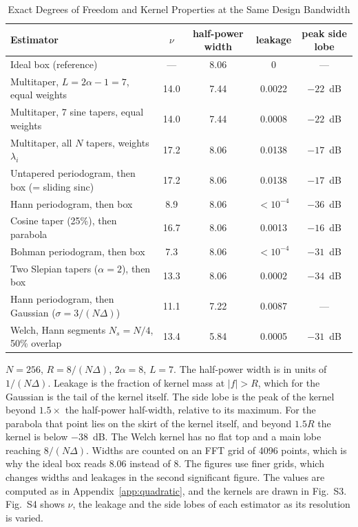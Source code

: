 \documentclass[10pt,twocolumn]{article}
\begin{document}
\begin{table}[!t]
\caption{Exact Degrees of Freedom and Kernel Properties at the Same Design Bandwidth}
\label{tab:dof}
\centering
\footnotesize
\begin{tabular}{lcccc}
\toprule
Estimator & $\nu$ & half-power width & leakage & peak side lobe\\
\midrule
Ideal box (reference) & --- & 8.06 & 0 & ---\\
Multitaper, $L=2\alpha-1=7$, equal weights & 14.0 & 7.44 & 0.0022 & $-22$~dB\\
Multitaper, 7 sine tapers, equal weights & 14.0 & 7.44 & 0.0008 & $-22$~dB\\
Multitaper, all $N$ tapers, weights $\lambda_i$ & 17.2 & 8.06 & 0.0138 & $-17$~dB\\
Untapered periodogram, then box (= sliding sinc) & 17.2 & 8.06 & 0.0138 & $-17$~dB\\
Hann periodogram, then box & 8.9 & 8.06 & $<10^{-4}$ & $-36$~dB\\
Cosine taper (25\%), then parabola & 16.7 & 8.06 & 0.0013 & $-16$~dB\\
Bohman periodogram, then box & 7.3 & 8.06 & $<10^{-4}$ & $-31$~dB\\
Two Slepian tapers ($\alpha=2$), then box & 13.3 & 8.06 & 0.0002 & $-34$~dB\\
Hann periodogram, then Gaussian ($\sigma=3/(N\Delta)$) & 11.1 & 7.22 & 0.0087 & ---\\
Welch, Hann segments $N_s=N/4$, 50\% overlap & 13.4 & 5.84 & 0.0005 & $-31$~dB\\
\bottomrule
\end{tabular}

\vspace{3pt}
\parbox{0.92\textwidth}{\footnotesize $N=256$, $R=8/(N\Delta)$, $2\alpha=8$, $L=7$. The half-power width is in units of $1/(N\Delta)$. Leakage is the fraction of kernel mass at $|f|>R$, which for the Gaussian is the tail of the kernel itself. The side lobe is the peak of the kernel beyond $1.5\times$ the half-power half-width, relative to its maximum. For the parabola that point lies on the skirt of the kernel itself, and beyond $1.5R$ the kernel is below $-38$~dB. The Welch kernel has no flat top and a main lobe reaching $8/(N\Delta)$. Widths are counted on an FFT grid of 4096 points, which is why the ideal box reads $8.06$ instead of $8$. The figures use finer grids, which changes widths and leakages in the second significant figure. The values are computed as in Appendix~\ref{app:quadratic}, and the kernels are drawn in Fig.~S3. Fig.~S4 shows $\nu$, the leakage and the side lobes of each estimator as its resolution is varied.}
\end{table}
\end{document}

